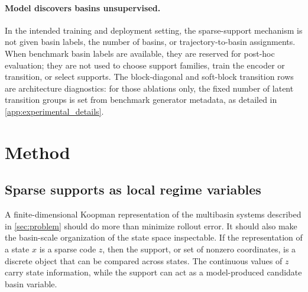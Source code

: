 \documentclass[11pt]{article}
\theoremstyle{plain}
\theoremstyle{definition}
\begin{document}
\paragraph{Model discovers basins unsupervised.} In the intended training and deployment setting, the sparse-support mechanism is not given basin labels, the number of basins, or trajectory-to-basin assignments. When benchmark basin labels are available, they are reserved for post-hoc evaluation; they are not used to choose support families, train the encoder or transition, or select supports. The block-diagonal and soft-block transition rows are architecture diagnostics: for those ablations only, the fixed number of latent transition groups is set from benchmark generator metadata, as detailed in \cref{app:experimental_details}.

\section{Method}
\label{sec:method}
\subsection{Sparse supports as local regime variables}
\label{sec:method_regime_supports}

 A finite-dimensional Koopman representation of the multibasin systems described in \cref{sec:problem} should do more than minimize rollout error. It should also make the basin-scale organization of the state space inspectable. If the representation of a state \(x\) is a sparse code \(z\), then the support, or set of nonzero coordinates, is a discrete object that can be compared across states. The continuous values of \(z\) carry state information, while the support can act as a model-produced candidate basin variable.

\end{document}
